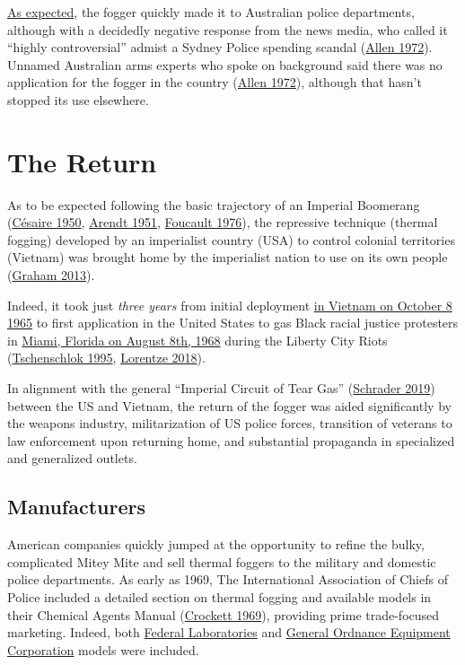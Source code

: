 \documentclass[
  11pt,
]{krantz}
\begin{document}
\protect\hyperlink{TheReturn}{As expected}, the fogger quickly made it to Australian police departments, although with a decidedly negative response from the news media, who called it ``highly controversial'' admist a Sydney Police spending scandal (\protect\hyperlink{ref-Allen1972}{Allen 1972}).
Unnamed Australian arms experts who spoke on background said there was no application for the fogger in the country (\protect\hyperlink{ref-Allen1972}{Allen 1972}), although that hasn't stopped its use elsewhere.

\hypertarget{TheReturn}{%
\chapter{The Return}\label{TheReturn}}

As to be expected following the basic trajectory of an Imperial Boomerang (\protect\hyperlink{ref-Cesaire1950}{Césaire 1950}, \protect\hyperlink{ref-Arendt1951}{Arendt 1951}, \protect\hyperlink{ref-Foucault1976}{Foucault 1976}), the repressive technique (thermal fogging) developed by an imperialist country (USA) to control colonial territories (Vietnam) was brought home by the imperialist nation to use on its own people (\protect\hyperlink{ref-Graham2013}{Graham 2013}).

Indeed, it took just \emph{three years} from initial deployment \protect\hyperlink{FirstUse}{in Vietnam on October 8 1965} to first application in the United States to gas Black racial justice protesters in \protect\hyperlink{MiamiFL1968_08_08}{Miami, Florida on August 8th, 1968} during the Liberty City Riots (\protect\hyperlink{ref-Tschenschlok1995}{Tschenschlok 1995}, \protect\hyperlink{ref-Lorentzen2018}{Lorentze 2018}).

In alignment with the general ``Imperial Circuit of Tear Gas'' (\protect\hyperlink{ref-Schrader2019}{Schrader 2019}) between the US and Vietnam, the return of the fogger was aided significantly by the weapons industry, militarization of US police forces, transition of veterans to law enforcement upon returning home, and substantial propaganda in specialized and generalized outlets.

\hypertarget{manufacturers}{%
\section{Manufacturers}\label{manufacturers}}

American companies quickly jumped at the opportunity to refine the bulky, complicated Mitey Mite and sell thermal foggers to the military and domestic police departments.
As early as 1969, The International Association of Chiefs of Police included a detailed section on thermal fogging and available models in their Chemical Agents Manual (\protect\hyperlink{ref-Crockett1969}{Crockett 1969}), providing prime trade-focused marketing.
Indeed, both \protect\hyperlink{FederalLaboratories}{Federal Laboratories} and \protect\hyperlink{GOEC}{General Ordnance Equipment Corporation} models were included.
\end{document}
